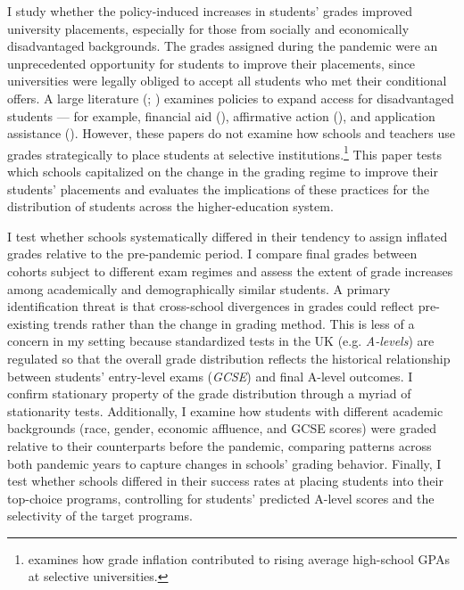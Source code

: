 
I study whether the policy-induced increases in students’ grades improved university placements, especially for those from socially and economically disadvantaged backgrounds. The grades assigned during the pandemic were an unprecedented opportunity for students to improve their placements, since universities were legally obliged to accept all students who met their conditional offers. A large literature (\cite{manski1983college}; \cite{Chetty2023}) examines policies to expand access for disadvantaged students — for example, financial aid (\cite{10.1257/000282803321455287}), affirmative action (\cite{10.1093/qje/qjab027}), and application assistance (\cite{10.1093/qje/qjs017}). However, these papers do not examine how schools and teachers use grades strategically to place students at selective institutions.\footnote{\cite{denning2023} examines how grade inflation contributed to rising average high-school GPAs at selective universities.} This paper tests which schools capitalized on the change in the grading regime to improve their students’ placements and evaluates the implications of these practices for the distribution of students across the higher-education system.

I test whether schools systematically differed in their tendency to assign inflated grades relative to the pre-pandemic period. I compare final grades between cohorts subject to different exam regimes and assess the extent of grade increases among academically and demographically similar students. A primary identification threat is that cross-school divergences in grades could reflect pre-existing trends rather than the change in grading method. This is less of a concern in my setting because standardized tests in the UK (e.g. \emph{A-levels}) are regulated so that the overall grade distribution reflects the historical relationship between students’ entry-level exams (\emph{GCSE}) and final A-level outcomes. I confirm stationary property of the grade distribution through a myriad of stationarity tests. Additionally, I examine how students with different academic backgrounds (race, gender, economic affluence, and GCSE scores) were graded relative to their counterparts before the pandemic, comparing patterns across both pandemic years to capture changes in schools’ grading behavior. Finally, I test whether schools differed in their success rates at placing students into their top-choice programs, controlling for students’ predicted A-level scores and the selectivity of the target programs.

